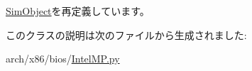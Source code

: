 \hyperlink{classm5_1_1SimObject_1_1SimObject_acce15679d830831b0bbe8ebc2a60b2ca}{SimObject}を再定義しています。

このクラスの説明は次のファイルから生成されました:\begin{DoxyCompactItemize}
\item 
arch/x86/bios/\hyperlink{IntelMP_8py}{IntelMP.py}\end{DoxyCompactItemize}
